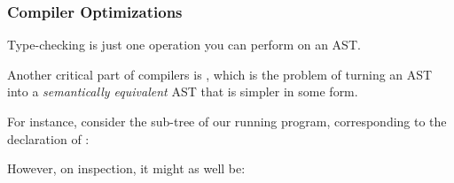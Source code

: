 \documentclass[aspectratio=169]{beamer}
\begin{document}
\begin{frame}[fragile]
  \frametitle{Compiler Optimizations}

  Type-checking is just one operation you can perform on an AST.

  \vspace{\fill}

  Another critical part of compilers is ,
  which is the problem of turning an AST into a \textit{semantically equivalent}
  AST that is simpler in some form.

  \vspace{\fill}

  \begin{center}
  \begin{minipage}[t]{0.45\textwidth}
    \raggedright

    For instance, consider the sub-tree of our running program, corresponding
    to the declaration of :
    \begin{center}
    \end{center}
  \end{minipage}
  \hspace{10pt}
  \begin{minipage}[t]{0.45\textwidth}
    \raggedright

    However, on inspection, it might as well be:

    \begin{center}
    \end{center}
  \end{minipage}
  \end{center}
\end{frame}
\end{document}

